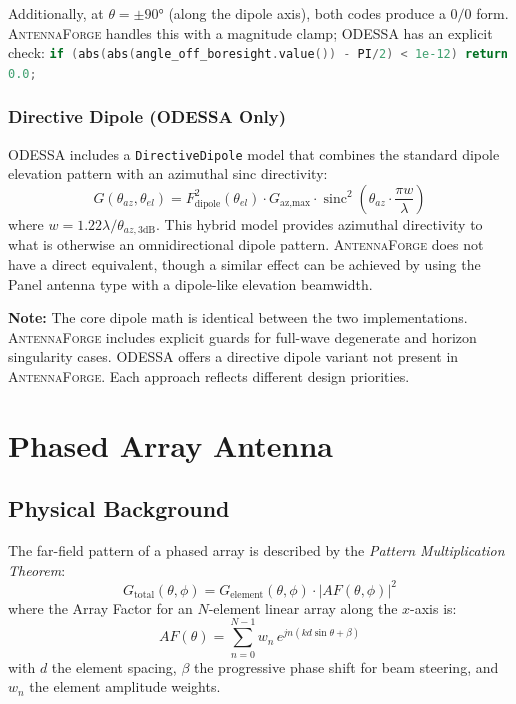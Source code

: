 \documentclass[11pt,a4paper]{article}
\newcommand{\AF}{\textsc{AntennaForge}}
\newcommand{\OD}{\textsc{ODESSA}}
\newcommand{\sinc}{\operatorname{sinc}}
\newcommand{\caveat}[1]{\par\noindent\colorbox{highlightyellow}{\parbox{\dimexpr\linewidth-2\fboxsep\relax}{\textbf{Note:} #1}}\par\medskip}
\begin{document}
Additionally, at $\theta = \pm 90°$ (along the dipole axis), both codes
produce a $0/0$ form.  \AF{} handles this with a magnitude clamp; \OD{} has
an explicit check:
\lstinline[language=C++]{if (abs(abs(angle_off_boresight.value()) - PI/2) < 1e-12) return 0.0;}

\subsubsection{Directive Dipole (\OD{} Only)}

\OD{} includes a \texttt{DirectiveDipole} model that combines the standard
dipole elevation pattern with an azimuthal sinc directivity:
\begin{equation}
  G(\theta_{az}, \theta_{el}) = F_{\text{dipole}}^2(\theta_{el}) \cdot
    G_{\text{az,max}} \cdot \sinc^2\!\left(\theta_{az} \cdot
    \frac{\pi w}{\lambda}\right)
\end{equation}
where $w = 1.22\lambda / \theta_{az,3\text{dB}}$.  This hybrid model provides
azimuthal directivity to what is otherwise an omnidirectional dipole pattern.
\AF{} does not have a direct equivalent, though a similar effect can be achieved
by using the Panel antenna type with a dipole-like elevation beamwidth.

\caveat{The core dipole math is identical between the two implementations.
\AF{} includes explicit guards for full-wave degenerate and horizon
singularity cases.  \OD{} offers a directive dipole variant not present
in \AF{}.  Each approach reflects different design priorities.}

\section{Phased Array Antenna}
\label{sec:array}

\subsection{Physical Background}

The far-field pattern of a phased array is described by the \emph{Pattern
Multiplication Theorem}:
\begin{equation}
  G_{\text{total}}(\theta, \phi) = G_{\text{element}}(\theta, \phi) \cdot
    |AF(\theta, \phi)|^2
  \label{eq:pmt}
\end{equation}
where the Array Factor for an $N$-element linear array along the $x$-axis is:
\begin{equation}
  AF(\theta) = \sum_{n=0}^{N-1} w_n \, e^{j n (k d \sin\theta + \beta)}
  \label{eq:af_linear}
\end{equation}
with $d$ the element spacing, $\beta$ the progressive phase shift for beam
steering, and $w_n$ the element amplitude weights.
\end{document}
